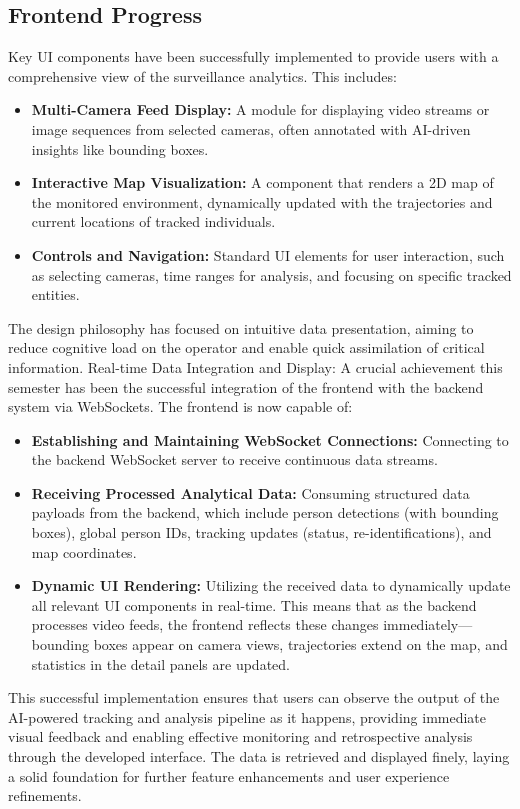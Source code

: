 \begin{itemize}
\subsection*{Frontend Progress}
\label{subsec:progress_frontend}
Key UI components have been successfully implemented to provide users with a comprehensive view of the surveillance analytics. This includes:
\begin{itemize}
    \item \textbf{Multi-Camera Feed Display:} A module for displaying video streams or image sequences from selected cameras, often annotated with AI-driven insights like bounding boxes.
    \item \textbf{Interactive Map Visualization:} A component that renders a 2D map of the monitored environment, dynamically updated with the trajectories and current locations of tracked individuals.
    \item \textbf{Controls and Navigation:}  Standard UI elements for user interaction, such as selecting cameras, time ranges for analysis, and focusing on specific tracked entities.
\end{itemize}
The design philosophy has focused on intuitive data presentation, aiming to reduce cognitive load on the operator and enable quick assimilation of critical information.
Real-time Data Integration and Display:
A crucial achievement this semester has been the successful integration of the frontend with the backend system via WebSockets. The frontend is now capable of:
\begin{itemize}
    \item \textbf{Establishing and Maintaining WebSocket Connections:} Connecting to the backend WebSocket server to receive continuous data streams.
    \item \textbf{Receiving Processed Analytical Data:} Consuming structured data payloads from the backend, which include person detections (with bounding boxes), global person IDs, tracking updates (status, re-identifications), and map coordinates.
    \item \textbf{Dynamic UI Rendering:} Utilizing the received data to dynamically update all relevant UI components in real-time. This means that as the backend processes video feeds, the frontend reflects these changes immediately—bounding boxes appear on camera views, trajectories extend on the map, and statistics in the detail panels are updated.
\end{itemize}
This successful implementation ensures that users can observe the output of the AI-powered tracking and analysis pipeline as it happens, providing immediate visual feedback and enabling effective monitoring and retrospective analysis through the developed interface. The data is retrieved and displayed finely, laying a solid foundation for further feature enhancements and user experience refinements.

\end{itemize}
